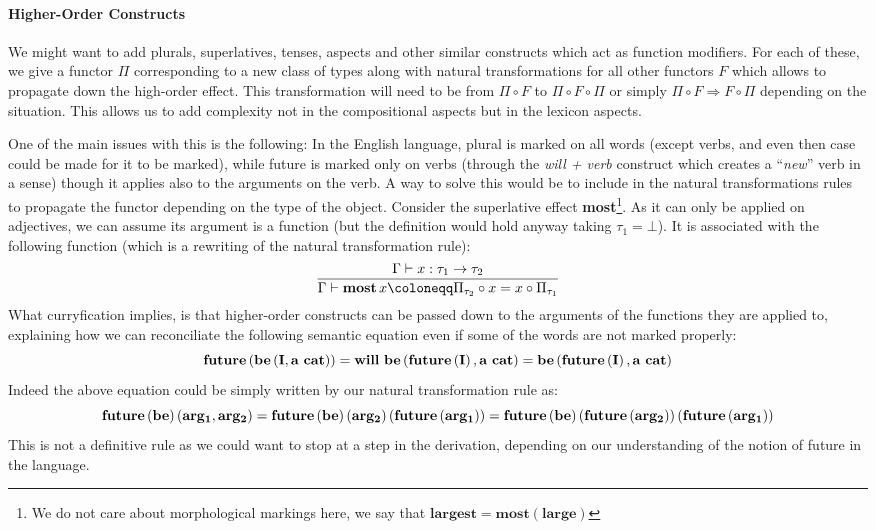 \paragraph{Higher-Order Constructs}
\label{par:higherorder}
We might want to add plurals, superlatives, tenses, aspects and other similar
constructs which act as function modifiers.
For each of these, we give a functor $\Pi$ corresponding to a new class of
types along with natural transformations for all other functors $F$ which
allows to propagate down the high-order effect.
This transformation will need to be from $\Pi \circ F$ to
$\Pi \circ F \circ \Pi$ or simply $\Pi \circ F \Rightarrow F \circ \Pi$
depending on the situation.
This allows us to add complexity not in the compositional aspects but
in the lexicon aspects.

One of the main issues with this is the following:
In the English language, plural is marked on all words (except verbs, and even
then case could be made for it to be marked), while future is marked only on
verbs (through the \textit{will + verb} construct which creates a ``\emph{new}''
verb in a sense) though it applies also to the arguments on the verb.
A way to solve this would be to include in the natural transformations rules to
propagate the functor depending on the type of the object.
Consider the superlative effect \textbf{most}\footnote{We do not care about
	morphological markings here, we say that
	$\mathbf{largest} = \mathbf{most} \left(\mathbf{large}\right)$}.
As it can only be applied on adjectives, we can assume its argument is a
function (but the definition would hold anyway taking $\tau_{1} = \bot$).
It is associated with the following function (which is a rewriting of the
natural transformation rule):
\begin{equation*}
	\frac{\cont x: \tau_{1} \to \tau_{2}}{\cont \mathbf{most}\, x \coloneqq
		\Pi_{\tau_{2}} \circ x = x \circ \Pi_{\tau_{1}}}
\end{equation*}
What curryfication implies, is that higher-order constructs can be passed down
to the arguments of the functions they are applied to, explaining how we can
reconciliate the following semantic equation even if some of the words are not
marked properly:
\begin{equation*}
	\bf future\left(be\left( I, a\ cat \right)\right)
	= will\ be\left( future\left( I \right), a\ cat \right)
	= be\left( future\left( I \right), a\ cat \right)
\end{equation*}
Indeed the above equation could be simply written by our natural transformation
rule as:
\begin{equation*}
	\bf future\left( be \right)\left( arg_{1}, arg_{2} \right) = future\left( be \right)\left( arg_{2} \right)\left( future\left( arg_{1} \right) \right) = future \left( be \right) \left( future \left( arg_{2} \right) \right) \left( future \left( arg_{1} \right) \right)
\end{equation*}
This is not a definitive rule as we could want to stop at a step in the
derivation, depending on our understanding of the notion of future in
the language.

